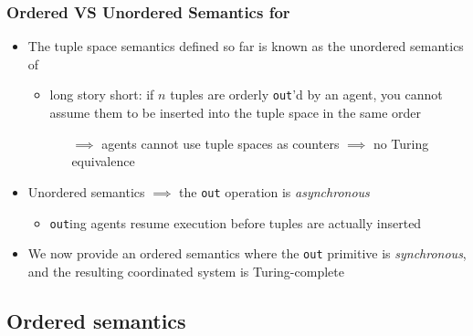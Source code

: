 \documentclass[presentation]{beamer}\mode<presentation>{\usetheme{AMSCesenaPurpleAndGold}}
\begin{document}
\begin{frame}
\frametitle{Ordered VS Unordered Semantics for \linda{}}

    \begin{itemize}
        \item The tuple space semantics defined so far is known as the \alert{unordered} semantics of \linda{}
        \begin{itemize}
            \item long story short: if $n$ tuples are orderly \texttt{out}'d by an agent, you cannot assume them to be inserted into the tuple space in the same order
            \begin{itemize}
                \item[$\implies$] agents cannot use tuple spaces as counters $\implies$ \alert{no Turing equivalence}
            \end{itemize}
        \end{itemize}
        
        \vfill
        
        \item Unordered semantics $\implies$ the \texttt{out} operation is \emph{asynchronous}
        \begin{itemize}
            \item \texttt{out}ing agents resume execution before tuples are actually inserted
        \end{itemize}
        
        \vfill
        
        \item We now provide an \alert{ordered} semantics where the \texttt{out} primitive is \emph{synchronous}, and the resulting coordinated system is Turing-complete
    \end{itemize} 

\end{frame}

\subsection{Ordered semantics}
\end{document}
